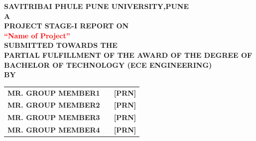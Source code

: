 \documentclass[12pt]{report}	%
\begin{document}
\begin{titlepage}
\thisfancypage{\setlength{\fboxsep}{10pt}\doublebox }{}
\vspace*{0.1in}
\begin{center}
            {\bf SAVITRIBAI PHULE PUNE UNIVERSITY,PUNE}\\
           {\bf A}\\
		{ \bf PROJECT STAGE-I REPORT ON}\\
\vspace{0.1in}
{\Large \bf \textcolor{red}{``Name of Project''}}
		\\
\vspace{0.1in}
{ \bf SUBMITTED TOWARDS THE}\\
{ \bf  PARTIAL FULFILLMENT OF THE AWARD OF THE DEGREE OF }\\
{ \bf BACHELOR OF TECHNOLOGY (ECE ENGINEERING)}\\
{{\bf BY}}\\
\end{center} 
  

\begin{table}[H]
\centering
\begin{tabular}{lll}
{{\color[HTML]{58429B} \textbf{MR. GROUP MEMBER1}}} &  & {{\color[HTML]{58429B} \textbf{{[}PRN{]}}}} \\
{\color[HTML]{58429B} \textbf{MR. GROUP MEMBER2}}                          &  & {\color[HTML]{58429B} \textbf{{[}PRN{]}}}                     \\
{\color[HTML]{58429B} \textbf{MR.  GROUP MEMBER3}}                       &  & {\color[HTML]{58429B} \textbf{{[}PRN{]}}}                     \\
{\color[HTML]{58429B} \textbf{MR. GROUP MEMBER4}}                  &  & {\color[HTML]{58429B} \textbf{{[}PRN{]}}}                    
\end{tabular}
\end{table}

\textbf{\textcolor{violet}{\hspace{7.07cm}}}


\end{titlepage}
\end{document}
